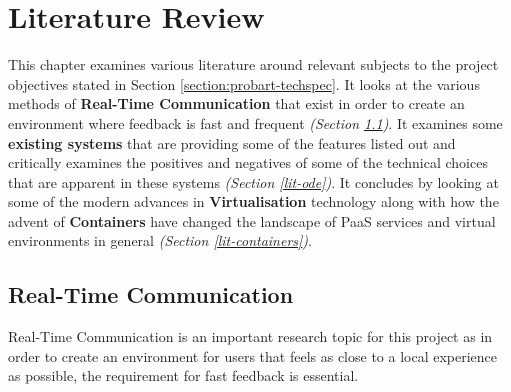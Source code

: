 

\chapter{Literature Review} \label{lit}


This chapter examines various literature around relevant subjects to the project objectives stated in Section \ref{section:probart-techspec}. It looks at the various methods of \textbf{Real-Time Communication} that exist in order to create an environment where feedback is fast and frequent \textit{(Section \ref{lit-rtc})}. It examines some \textbf{existing systems} that are providing some of the features listed out and critically examines the positives and negatives of some of the technical choices that are apparent in these systems \textit{(Section \ref{lit-ode})}. It concludes by looking at some of the modern advances in \textbf{Virtualisation} technology along with how the advent of \textbf{Containers} have changed the landscape of PaaS services and virtual environments in general \textit{(Section \ref{lit-containers})}.

\section{Real-Time Communication} \label{lit-rtc}

Real-Time Communication is an important research topic for this project as in order to create an environment for users that feels as close to a local experience as possible, the requirement for fast feedback is essential.

